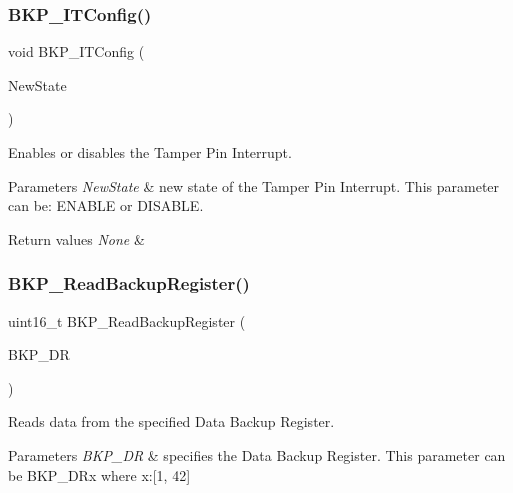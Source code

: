\subsubsection{\texorpdfstring{BKP\_ITConfig()}{BKP\_ITConfig()}}
{\footnotesize\ttfamily void B\+K\+P\+\_\+\+I\+T\+Config (\begin{DoxyParamCaption}\item[{\mbox{\hyperlink{group___exported__types_gac9a7e9a35d2513ec15c3b537aaa4fba1}{Functional\+State}}}]{New\+State }\end{DoxyParamCaption})}



Enables or disables the Tamper Pin Interrupt. 


\begin{DoxyParams}{Parameters}
{\em New\+State} & new state of the Tamper Pin Interrupt. This parameter can be\+: E\+N\+A\+B\+LE or D\+I\+S\+A\+B\+LE. \\
\hline
\end{DoxyParams}

\begin{DoxyRetVals}{Return values}
{\em None} & \\
\hline
\end{DoxyRetVals}
\mbox{\label{group___b_k_p___private___functions_ga359d8fbc945e0f4e34fedbe037d842c8}} 
\subsubsection{\texorpdfstring{BKP\_ReadBackupRegister()}{BKP\_ReadBackupRegister()}}
{\footnotesize\ttfamily uint16\+\_\+t B\+K\+P\+\_\+\+Read\+Backup\+Register (\begin{DoxyParamCaption}\item[{uint16\+\_\+t}]{B\+K\+P\+\_\+\+DR }\end{DoxyParamCaption})}



Reads data from the specified Data Backup Register. 


\begin{DoxyParams}{Parameters}
{\em B\+K\+P\+\_\+\+DR} & specifies the Data Backup Register. This parameter can be B\+K\+P\+\_\+\+D\+Rx where x\+:\mbox{[}1, 42\mbox{]} \\
\hline
\end{DoxyParams}

